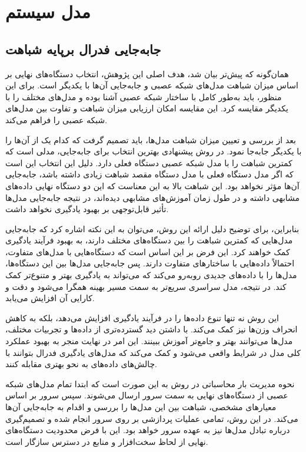  
\section{مدل سیستم}
\subsection{
	جابه‌جایی فدرال برپایه شباهت%
}

همان‌گونه که پیش‌تر بیان شد، هدف اصلی این پژوهش، انتخاب دستگاه‌های نهایی بر اساس میزان شباهت مدل‌های شبکه عصبی و جابه‌جایی آن‌ها با یکدیگر است. برای این منظور، باید به‌طور کامل با ساختار شبکه عصبی آشنا بوده و مدل‌های مختلف را با یکدیگر مقایسه کرد. این مقایسه امکان ارزیابی میزان شباهت و تفاوت بین مدل‌های شبکه عصبی را فراهم می‌کند.

بعد از بررسی و تعیین میزان شباهت مدل‌ها، باید تصمیم گرفت که کدام یک از آن‌ها را با یکدیگر جابه‌جا نمود. در روش پیشنهادی
بهترین انتخاب برای جابه‌جایی، مدلی است که کمترین شباهت را با مدل شبکه عصبی دستگاه فعلی دارد. دلیل این انتخاب این است که اگر مدل دستگاه فعلی با مدل دستگاه مقصد شباهت زیادی داشته باشد، جابه‌جایی آن‌ها مؤثر نخواهد بود. این شباهت بالا به این معناست که این دو دستگاه نهایی داده‌های مشابهی داشته و در طول زمان آموزش‌های مشابهی دیده‌اند، در نتیجه جابه‌جایی مدل‌ها تأثیر قابل‌توجهی بر بهبود یادگیری نخواهد داشت.

بنابراین، برای توضیح دلیل ارائه این روش، می‌توان به این نکته اشاره کرد که جابه‌جایی مدل‌هایی که کمترین شباهت را بین دستگاه‌های مختلف دارند، به بهبود فرآیند یادگیری کمک خواهند کرد. این فرض بر این اساس است که دستگاه‌هایی با مدل‌های متفاوت، احتمالاً داده‌هایی با ساختارهای متفاوت دارند. پس جابه‌جایی مدل‌ها بین این دستگاه‌ها، مدل‌ها را با داده‌های جدیدی روبه‌رو می‌کند که می‌تواند به یادگیری بهتر و متنوع‌تر کمک کند. در نتیجه، مدل سراسری سریع‌تر به سمت مسیر بهینه همگرا می‌شود و دقت و کارایی آن افزایش می‌یابد.

این روش نه تنها تنوع داده‌ها را در فرآیند یادگیری افزایش می‌دهد، بلکه به کاهش انحراف وزن‌ها نیز کمک می‌کند. با داشتن دید گسترده‌تری از داده‌ها و تجربیات مختلف، مدل‌ها می‌توانند بهتر و جامع‌تر آموزش ببینند. این امر در نهایت منجر به بهبود عملکرد کلی مدل در شرایط واقعی می‌شود و کمک می‌کند که مدل‌های یادگیری فدرال بتوانند با چالش‌های داده‌های
به نحو بهتری مقابله کنند.


نحوه مدیریت بار محاسباتی در روش
به این صورت است که ابتدا تمام مدل‌های شبکه عصبی از دستگاه‌های نهایی به سمت سرور ارسال می‌شوند. سپس سرور بر اساس معیارهای مشخصی، شباهت بین این مدل‌ها را بررسی و اقدام به جابه‌جایی آن‌ها می‌کند. در این روش، تمامی عملیات پردازشی بر روی سرور انجام شده و تصمیم‌گیری درباره تبادل مدل‌ها نیز به عهده سرور خواهد بود. این با فرض محدودیت دستگاه‌های نهایی از لحاظ سخت‌افزار و منابع در دسترس سازگار است.

